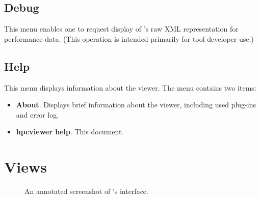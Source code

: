 
\subsection{Debug}

This menu enables one to request display of \HPCToolkit{}'s raw XML representation for performance data.
(This operation is intended primarily for tool developer use.)


\subsection{Help}

This menu displays information about the viewer. The menu contains two items:
\begin{itemize}

\item \textbf{About}.
  Displays brief information about the viewer, including used plug-ins and error log.

\item \textbf{hpcviewer help}.
  This document.

\end{itemize}



\section{Views}

\begin{figure}[t]
\caption{An annotated screenshot of \hpcviewer{}'s interface.}
\label{fig:hpcviewer-legend}
\end{figure}

